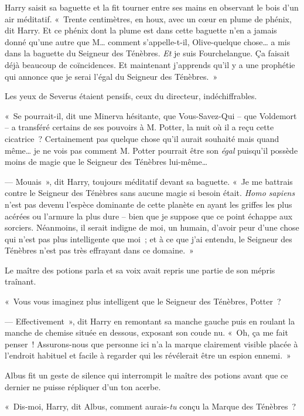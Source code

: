 Harry saisit sa baguette et la fit tourner entre ses mains en observant le bois d'un air méditatif. «~Trente centimètres, en houx, avec un cœur en plume de phénix, dit Harry. Et ce phénix dont la plume est dans cette baguette n'en a jamais donné qu'une autre que M… comment s'appelle-t-il, Olive-quelque chose… a mis dans la baguette du Seigneur des Ténèbres. \emph{Et} je suis Fourchelangue. Ça faisait déjà beaucoup de coïncidences. Et maintenant j'apprends qu'il y a une prophétie qui annonce que je serai l'égal du Seigneur des Ténèbres.~»

Les yeux de Severus étaient pensifs, ceux du directeur, indéchiffrables.

«~Se pourrait-il, dit une Minerva hésitante, que Vous-Savez-Qui -- que Voldemort -- a transféré certains de ses pouvoirs à M. Potter, la nuit où il a reçu cette cicatrice~? Certainement pas quelque chose qu'il aurait souhaité mais quand même… je ne vois pas comment M. Potter pourrait être son \emph{égal} puisqu'il possède moins de magie que le Seigneur des Ténèbres lui-même…

--- Mouais~», dit Harry, toujours méditatif devant sa baguette. «~Je me battrais contre le Seigneur des Ténèbres sans aucune magie si besoin était. \emph{Homo sapiens} n'est pas devenu l'espèce dominante de cette planète en ayant les griffes les plus acérées ou l'armure la plus dure -- bien que je suppose que ce point échappe aux sorciers. Néanmoins, il serait indigne de moi, un humain, d'avoir peur d'une chose qui n'est pas plus intelligente que moi~; et à ce que j'ai entendu, le Seigneur des Ténèbres n'est pas très effrayant dans ce domaine.~»

Le maître des potions parla et sa voix avait repris une partie de son mépris traînant.

«~Vous vous imaginez plus intelligent que le Seigneur des Ténèbres, Potter~?

--- Effectivement~», dit Harry en remontant sa manche gauche puis en roulant la manche de chemise située en dessous, exposant son coude nu. «~Oh, ça me fait penser~! Assurons-nous que personne ici n'a la marque clairement visible placée à l'endroit habituel et facile à regarder qui les révélerait être un espion ennemi.~»

Albus fit un geste de silence qui interrompit le maître des potions avant que ce dernier ne puisse répliquer d'un ton acerbe.

«~Dis-moi, Harry, dit Albus, comment aurais-\emph{tu} conçu la Marque des Ténèbres~?

